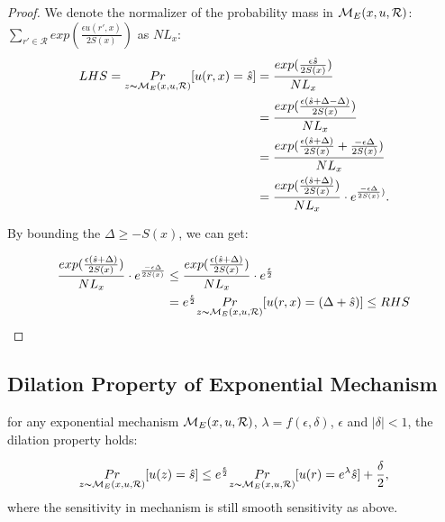 \begin{proof}
We denote the normalizer of the probability mass in $\mathcal{M}_E(x, u, \mathcal{R})$: $\sum_{r' \in \mathcal{R}}exp(\frac{\epsilon u(r',x)}{2 S(x)})$ as $NL_x$:
\begin{equation*}
\begin{split}
LHS 
  = \underset{z \thicksim \mathcal{M}_E(x, u, \mathcal{R})}{Pr}[u(r,x) = \hat{s}]
& = \frac{exp(\frac{\epsilon \hat{s}}{2 S(x)})}{NL_x}\\
& = \frac{exp(\frac{\epsilon (\hat{s} + \Delta - \Delta)}{2 S(x)})}{NL_x}\\
& = \frac{exp(\frac{\epsilon (\hat{s} + \Delta)}{2 S(x)} + \frac{- \epsilon \Delta}{2 S(x)})}{NL_x}\\
& = \frac{exp(\frac{\epsilon (\hat{s} + \Delta)}{2 S(x)})}{NL_x} \cdot e^{\frac{- \epsilon \Delta}{2 S(x)})}.\\
\end{split}
\end{equation*}

By bounding the $\Delta \geq -S(x)$, we can get:

\begin{equation*}
\begin{split}
\frac{exp(\frac{\epsilon (\hat{s} + \Delta)}{2 S(x)})}{NL_x} \cdot e^{\frac{- \epsilon \Delta}{2 S(x)}}
& \leq \frac{exp(\frac{\epsilon (\hat{s} + \Delta)}{2 S(x)})}{NL_x} \cdot e^{\frac{\epsilon}{2}}\\
&  =  e^{\frac{\epsilon}{2}} \underset{z \thicksim \mathcal{M}_E(x, u, \mathcal{R})}{Pr}[u(r,x) = (\Delta + \hat{s})] \leq RHS\\
\end{split}
\end{equation*}

\end{proof}

\subsection{Dilation Property of Exponential Mechanism}
\begin{lem}
for any exponential mechanism $\mathcal{M}_E(x, u, \mathcal{R})$, $\lambda = f(\epsilon, \delta)$, $\epsilon$ and $|\delta| < 1$, the dilation property holds:

\begin{equation*}
\underset{z \thicksim \mathcal{M}_E(x, u, \mathcal{R})}{Pr}[u(z) = \hat{s}]
\leq
e^{\frac{\epsilon}{2}} \underset{z \thicksim \mathcal{M}_E(x, u, \mathcal{R})}{Pr}[u(r) = e^{\lambda} \hat{s}] + \frac{\delta}{2},
\end{equation*}
where the sensitivity in mechanism is still smooth sensitivity as above.
\end{lem}

